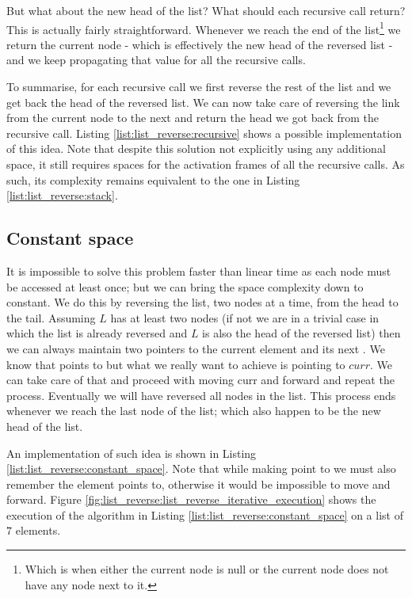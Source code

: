 But what about the new head of the list? What should each recursive call return? This is actually
fairly straightforward. Whenever we reach the end of the list\footnote{Which is when either the current node
is null or the current node does not have any node next to it.} we return the current node -  which is
effectively the new head of the reversed list -  and we keep propagating that value for all the
recursive calls. 

To summarise, for each recursive call we first reverse the rest of the list and we get back the head
of the reversed list. We can now take care of reversing the link from the current node to the next
and return the head we got back from the recursive call. Listing \ref{list:list_reverse:recursive}
shows a possible implementation of this idea. Note that despite this solution not explicitly
using any additional space, it still requires spaces for the activation frames of all the recursive
calls. As such,  its complexity remains equivalent to the one in Listing \ref{list:list_reverse:stack}.



\subsection{Constant space}
It is impossible to solve this problem faster than linear time as each node must be accessed at least
once; but we can bring the space complexity down to constant. We do this by reversing the list, two nodes at a
time,  from the head to the tail. Assuming $L$ has at least two nodes (if not we are in a trivial case
in which the list is already reversed and $L$ is also the head of the reversed list) then we can
always maintain two pointers to the current element and its next . We know that
points to  but what we really want to achieve is  pointing to $curr$.
We can take care of that and proceed with moving curr and  forward and repeat the process.
Eventually we will have reversed all nodes in the list. This process ends whenever we reach the last node
of the list; which also happen to be the new head of the list.

An implementation of such idea is shown in Listing \ref{list:list_reverse:constant_space}. Note
that while making  point to we must also remember the element
 points to, otherwise it would be impossible to move  and
 forward.
Figure \ref{fig:list_reverse:list_reverse_iterative_execution} shows the execution of the algorithm in Listing \ref{list:list_reverse:constant_space} on a list of $7$ elements.


